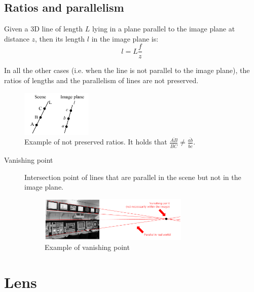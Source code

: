 \subsection{Ratios and parallelism}

Given a 3D line of length $L$ lying in a plane parallel to the image plane at distance $z$,
then its length $l$ in the image plane is:
\[ l = L\frac{f}{z} \]

In all the other cases (i.e. when the line is not parallel to the image plane), 
the ratios of lengths and the parallelism of lines are not preserved.

\begin{figure}[h]
    \centering
    \includegraphics[width=0.3\textwidth]{./img/_perspective_projection_ratio.pdf}
    \caption{Example of not preserved ratios. It holds that $\frac{\overline{AB}}{\overline{BC}} \neq \frac{\overline{ab}}{\overline{bc}}$.}
\end{figure}

\begin{description}
    \item[Vanishing point] 
        Intersection point of lines that are parallel in the scene but not in the image plane.

        \begin{figure}[h]
            \centering
            \includegraphics[width=0.7\textwidth]{./img/_vanishing_point.pdf}
            \caption{Example of vanishing point}
        \end{figure}
\end{description}



\section{Lens}

